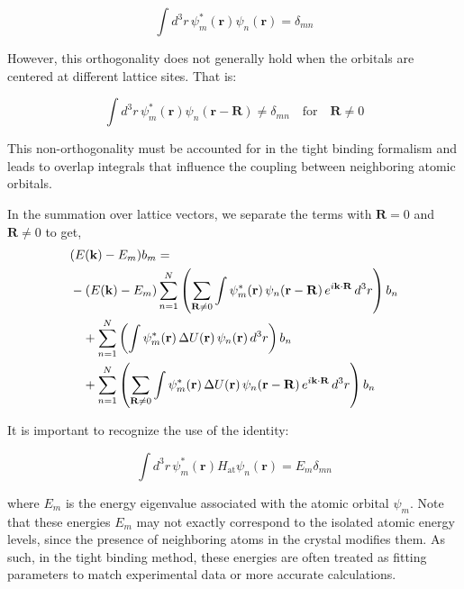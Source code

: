 \begin{equation}
	\int d^3r \, \psi_m^*(\mathbf{r}) \psi_n(\mathbf{r}) = \delta_{mn}
\end{equation}

\noindent
However, this orthogonality does not generally hold when the orbitals are centered at different lattice sites. That is:

\begin{equation}
	\int d^3r \, \psi_m^*(\mathbf{r}) \psi_n(\mathbf{r} - \mathbf{R}) \neq \delta_{mn} \quad \text{for} \quad \mathbf{R} \ne 0
\end{equation}

\noindent
This non-orthogonality must be accounted for in the tight binding formalism and leads to overlap integrals that influence the coupling between neighboring atomic orbitals.

In the summation over lattice vectors, we separate the terms with $\mathbf{R} = 0$ and $\mathbf{R} \neq 0$ to get,
\begin{align*}
	 & (E(\mathbf{k}) - E_m) b_m =                                                                                                                                                                           \\
	 & -(E(\mathbf{k}) - E_m) \sum_{n=1}^{N} \left( \sum_{\mathbf{R} \neq 0} \int \psi_m^*(\mathbf{r}) \, \psi_n(\mathbf{r} - \mathbf{R}) \, e^{i \mathbf{k} \cdot \mathbf{R}} \, d^3 r \right) b_n \notag   \\
	 & \quad + \sum_{n=1}^{N} \left( \int \psi_m^*(\mathbf{r}) \, \Delta U(\mathbf{r}) \, \psi_n(\mathbf{r}) \, d^3 r \right) b_n \notag                                                                     \\
	 & \quad + \sum_{n=1}^{N} \left( \sum_{\mathbf{R} \neq 0} \int \psi_m^*(\mathbf{r}) \, \Delta U(\mathbf{r}) \, \psi_n(\mathbf{r} - \mathbf{R}) \, e^{i \mathbf{k} \cdot \mathbf{R}} \, d^3 r \right) b_n
\end{align*}

It is important to recognize the use of the identity:

\begin{equation}
	\int d^3r \, \psi_m^*(\mathbf{r}) H_{\text{at}} \psi_n(\mathbf{r}) = E_m \delta_{mn}
\end{equation}

\noindent
where \( E_m \) is the energy eigenvalue associated with the atomic orbital \( \psi_m \). Note that these energies \( E_m \) may not exactly correspond to the isolated atomic energy levels, since the presence of neighboring atoms in the crystal modifies them. As such, in the tight binding method, these energies are often treated as fitting parameters to match experimental data or more accurate calculations.

